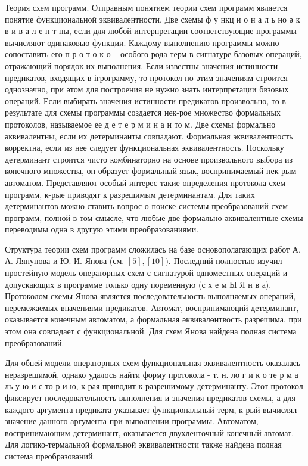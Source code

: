 \documentclass[10pt]{article}
\begin{document}
Теория схем программ. Отправным понятием теории схем программ является понятие функциональной эквивалентности. Две схемы ф у нкц и о н а л ь но ә к в и в а л е н т ны, если для любой интерпретации соответствующие программы вычисляют одинаковыө функции. Каждому выполнению программы можно сопоставить его п р о т о к о -- особого рода терм в сигнатуре базовых операций, отражающий порядок их выполнения. Если известны значения истинности предикатов, входящих в ігрограмму, то протокол по әтим значениям строится однозначно, при әтом для построения не нужно знать интерпретации бвзовых операций. Если выбирать значения истинности предикатов произвольно, то в результате для схемы программы создается нек-рое множество формальных протоколов, называемое ее д е т е р м и н а н то м. Две схемы формально әквивалентны, если их детерминанты совпадают. Формальная эквивалентность корректна, если из нее следует функциональная эквивалентность. Поскольку детерминант строится чисто комбинаторно на основе произвольного выбора из конечного множества, он образует формальный язык, воспринимаемый нек-рым автоматом. Представляют особый интерес такие определения протокола схем программ, к-рые приводят к разрешимым детерминантам. Для таких детерминантов можно ставить вопрос о поиске системы преобразований схем программ, полной в том смысле, что любые две формально әквивалентные схемы переводимы одна в другую этими преобразованиями.



Структура теории схем программ сложилась на базе основополагающих работ А. А. Ляпунова и Ю. И. Янова (см. $[5],[10])$. Последний полностью изучил простейпую модель операторных схем с сигнатурой одноместных операций и допускающих в программе только одну поременную (с х е м Ы Я н в а). Протоколом схемы Янова является последовательность выполняемых операций, перемежаемых вначениями предикатов. Автомат, воспринимаюций детерминант, оказывается конечным автоматом, а формальная әквивалөнтвость разрешима, при этом она совпадает с функциональной. Для схем Янова найдена полная система преобразований.



Для обџей модели операторных схем функциональная эквивалентность оказалась неразрешимой, однако удалось найти форму протокола - т. н. ло г и к о те р м а ль у ю и с то р и ю, к-рая приводит к разрешимому детерминанту. Этот протокол фиксирует последовательность выполнения и значения предикатов схемы, а для каждого аргумента предиката указывает функциональный терм, к-рый вычислял значение данного аргумента при выполнении программы. Автоматом, воспринимающим детерминант, оказывается двухленточный конечный автомат. Для логико-термальной формальной эквивалентности также найдена полная система преобразований.
\end{document}
